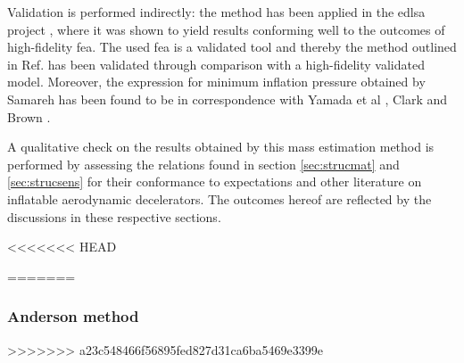 Validation is performed indirectly: the method \cite{Samareh2011} has been applied in the \gls{edlsa} project \cite{Cianciolo2010}, where it was shown to yield results conforming well to the outcomes of high-fidelity \gls{fea}. The used \gls{fea} is a validated tool \cite{Cianciolo2010} and thereby the method outlined in Ref.\cite{Samareh2011} has been validated through comparison with a high-fidelity validated model. Moreover, the expression for minimum inflation pressure obtained by Samareh has been found to be in correspondence with Yamada et al \cite{Yamada2009}, Clark \cite{Clark2009} and Brown \cite{Brown2009}.

A qualitative check on the results obtained by this mass estimation method is performed by assessing the relations found in section \ref{sec:strucmat} and \ref{sec:strucsens} for their conformance to expectations and other literature on inflatable aerodynamic decelerators. The outcomes hereof are reflected by the discussions in these respective sections.

<<<<<<< HEAD

=======
\subsubsection{Anderson method}
>>>>>>> a23c548466f56895fed827d31ca6ba5469e3399e

